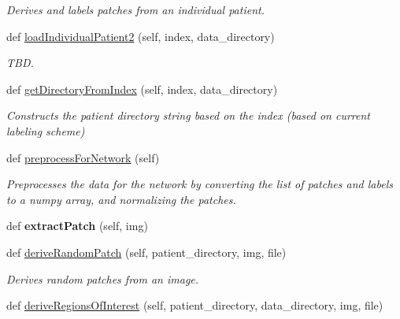 \begin{DoxyCompactItemize}
\begin{DoxyCompactList}\small\item\em Derives and labels patches from an individual patient. \end{DoxyCompactList}\item 
def \mbox{\hyperlink{classDataHandler_1_1DataHandler_adb62cd0555482a270a18f9801938a00d}{load\+Individual\+Patient2}} (self, index, data\+\_\+directory)
\begin{DoxyCompactList}\small\item\em T\+BD. \end{DoxyCompactList}\item 
def \mbox{\hyperlink{classDataHandler_1_1DataHandler_afd589c1c68b4189c4ec6f7ff1d7dd81f}{get\+Directory\+From\+Index}} (self, index, data\+\_\+directory)
\begin{DoxyCompactList}\small\item\em Constructs the patient directory string based on the index (based on current labeling scheme) \end{DoxyCompactList}\item 
\mbox{\label{classDataHandler_1_1DataHandler_a51e4cac44cc8cab7e58279b54ffbad05}} 
def \mbox{\hyperlink{classDataHandler_1_1DataHandler_a51e4cac44cc8cab7e58279b54ffbad05}{preprocess\+For\+Network}} (self)
\begin{DoxyCompactList}\small\item\em Preprocesses the data for the network by converting the list of patches and labels to a numpy array, and normalizing the patches. \end{DoxyCompactList}\item 
\mbox{\label{classDataHandler_1_1DataHandler_a414ba5e860a4cee65d3532c1c5112383}} 
def {\bfseries extract\+Patch} (self, img)
\item 
def \mbox{\hyperlink{classDataHandler_1_1DataHandler_ac0052a0b42d5daf65187ccbeed8b8554}{derive\+Random\+Patch}} (self, patient\+\_\+directory, img, file)
\begin{DoxyCompactList}\small\item\em Derives random patches from an image. \end{DoxyCompactList}\item 
def \mbox{\hyperlink{classDataHandler_1_1DataHandler_aa2a4901a69b659c795fade7cbf3f14be}{derive\+Regions\+Of\+Interest}} (self, patient\+\_\+directory, data\+\_\+directory, img, file)

\end{DoxyCompactItemize}
